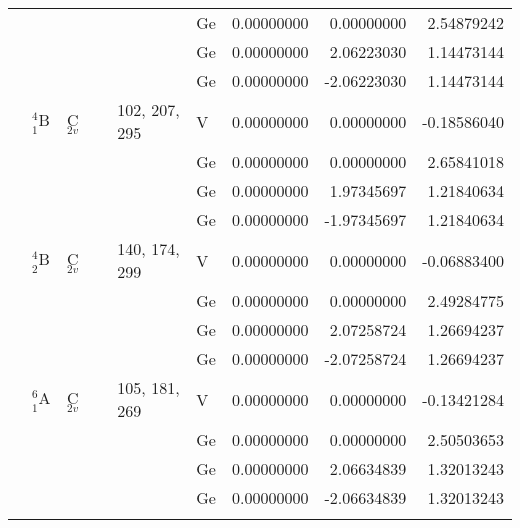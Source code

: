 \begin{center}
\begin{landscape}
\begin{longtable}{@{}clllllrrr@{}}
					&       &      &  &                                      & Ge  &   0.00000000  &   0.00000000  &   2.54879242 \\
					&       &      &  &                                      & Ge  &   0.00000000  &   2.06223030  &   1.14473144 \\
					&       &      &  &                                      & Ge  &   0.00000000  &  -2.06223030  &   1.14473144 \\
	& $^4$B$_1$     & C$_{2v}$     &  & 102, 207, 295                        & V   &   0.00000000  &   0.00000000  &  -0.18586040 \\
					&       &      &  &                                      & Ge  &   0.00000000  &   0.00000000  &   2.65841018 \\
					&       &      &  &                                      & Ge  &   0.00000000  &   1.97345697  &   1.21840634 \\
					&       &      &  &                                      & Ge  &   0.00000000  &  -1.97345697  &   1.21840634 \\
	& $^4$B$_2$     & C$_{2v}$     &  & 140, 174, 299                        & V   &   0.00000000  &   0.00000000  &  -0.06883400 \\
					&       &      &  &                                      & Ge  &   0.00000000  &   0.00000000  &   2.49284775 \\
					&       &      &  &                                      & Ge  &   0.00000000  &   2.07258724  &   1.26694237 \\
					&       &      &  &                                      & Ge  &   0.00000000  &  -2.07258724  &   1.26694237 \\
	& $^6$A$_1$     & C$_{2v}$     &  & 105, 181, 269                        & V   &   0.00000000  &   0.00000000  &  -0.13421284 \\
					&       &      &  &                                      & Ge  &   0.00000000  &   0.00000000  &   2.50503653 \\
					&       &      &  &                                      & Ge  &   0.00000000  &   2.06634839  &   1.32013243 \\
					&       &      &  &                                      & Ge  &   0.00000000  &  -2.06634839  &   1.32013243 \\ 
\label{a5tbl:geometries} 
\end{longtable}
\end{landscape}
\end{center}



